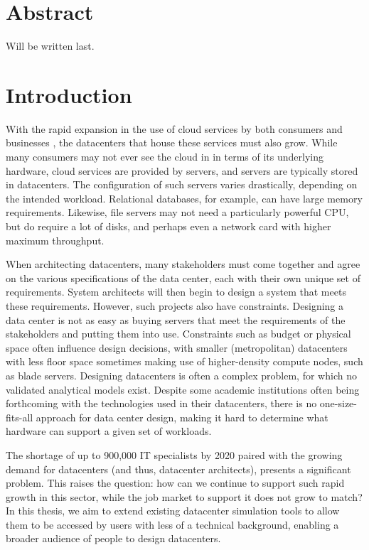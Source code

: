 \documentclass[11pt]{article}
\begin{document}
\newpage


\setcounter{tocdepth}{2}
\tableofcontents
\newpage
\listoffigures
\listoftables
\newpage


\section*{Abstract}
Will be written last.
\newpage

\section{Introduction} \label{sec:introduction}
	With the rapid expansion in the use of cloud services by both consumers and businesses \cite{Kushida2015}\cite{mokhtar2013}, the datacenters that house these services must also grow. 
	While many consumers may not ever see the cloud in in terms of its underlying hardware, cloud services are provided by servers, and servers are typically stored in datacenters. 
	The configuration of such servers varies drastically, depending on the intended workload. 
	Relational databases, for example, can have large memory requirements. 
	Likewise, file servers may not need a particularly powerful CPU, but do require a lot of disks, and perhaps even a network card with higher maximum throughput.

	When architecting datacenters, many stakeholders must come together and agree on the various specifications of the data center, each with their own unique set of requirements. 
	System architects will then begin to design a system that meets these requirements. 
	However, such projects also have constraints. 
	Designing a data center is not as easy as buying servers that meet the requirements of the stakeholders and putting them into use. 
	Constraints such as budget or physical space often influence design decisions, with smaller (metropolitan) datacenters with less floor space sometimes making use of higher-density compute nodes, such as blade servers. 
	Designing datacenters is often a complex problem, for which no validated analytical models exist. 
	Despite some academic institutions often being forthcoming with the technologies used in their datacenters, there is no one-size-fits-all approach for data center design, making it hard to determine what hardware can support a given set of workloads.

	The shortage of up to 900,000 IT specialists by 2020\cite{Gareis2014} paired with the growing demand for datacenters (and thus, datacenter architects), presents a significant problem.
	This raises the question: how can we continue to support such rapid growth in this sector, while the job market to support it does not grow to match?
	In this thesis, we aim to extend existing datacenter simulation tools to allow them to be accessed by users with less of a technical background, enabling a broader audience of people to design datacenters.
\end{document}

